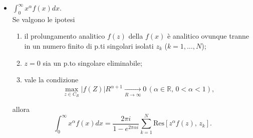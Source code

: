 \begin{itemize}
    \item $\displaystyle \int_{0}^{\infty}x^\alpha f(x) dx$.\\ 
        Se valgono le ipotesi
        \begin{enumerate}[label=(\roman*)]
            \item il prolungamento analitico $f(z)$ della $f(x)$ è analitico ovunque tranne in un numero finito di p.ti singolari isolati $z_k$ ($k=1,\dots,N$);
            \item $z=0$ sia un p.to singolare eliminabile;
            \item vale la condizione 
            \[
                \max_{z\in C_R}|f(Z)|R^{\alpha+1}\xrightarrow[R\to\infty]{}0\, (\alpha\in\mathbb{R},\, 0<\alpha<1),
            \]
        \end{enumerate}
        allora
        \[
            \int_{0}^{\infty}x^\alpha f(x) dx = \frac{2\pi i}{1-e^{2\pi\alpha i}}\sum_{k=1}^{N}\text{Res}[z^\alpha f(z),\,z_k].
        \]
     
        
      

\end{itemize}
